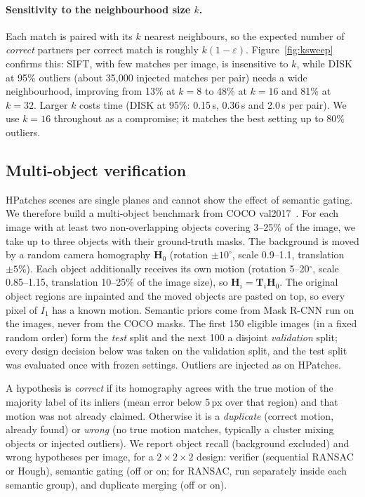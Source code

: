 \documentclass{article}
\begin{document}
\paragraph{Sensitivity to the neighbourhood size $k$.} Each match is paired
with its $k$ nearest neighbours, so the expected number of \emph{correct}
partners per correct match is roughly $k(1-\varepsilon)$. Figure~\ref{fig:ksweep}
confirms this: SIFT, with few matches per image, is insensitive to $k$, while
DISK at 95\% outliers (about 35{,}000 injected matches per pair) needs a wide
neighbourhood, improving from 13\% at $k=8$ to 48\% at $k=16$ and 81\% at
$k=32$. Larger $k$ costs time (DISK at 95\%: 0.15\,s, 0.36\,s and 2.0\,s per
pair). We use $k=16$ throughout as a compromise; it matches the best setting
up to 80\% outliers.

\subsection{Multi-object verification}
\label{sec:multiobj}
HPatches scenes are single planes and cannot show the effect of semantic
gating. We therefore build a multi-object benchmark from COCO
val2017~\cite{lin2014coco}. For each image with at least two non-overlapping
objects covering 3--25\% of the image, we take up to three objects with their
ground-truth masks. The background is moved by a random camera homography
$\mathbf{H}_0$ (rotation $\pm10^\circ$, scale 0.9--1.1, translation $\pm5\%$).
Each object additionally receives its own motion (rotation 5--20$^\circ$,
scale 0.85--1.15, translation 10--25\% of the image size), so
$\mathbf{H}_i = \mathbf{T}_i\mathbf{H}_0$. The original object regions are
inpainted and the moved objects are pasted on top, so every pixel of $I_1$
has a known motion. Semantic priors come from Mask R-CNN run on the images,
never from the COCO masks. The first 150 eligible images (in a fixed random
order) form the \emph{test} split and the next 100 a disjoint
\emph{validation} split; every design decision below was taken on the
validation split, and the test split was evaluated once with frozen settings.
Outliers are injected as on HPatches.

A hypothesis is \emph{correct} if its homography agrees with the true motion
of the majority label of its inliers (mean error below 5\,px over that region)
and that motion was not already claimed. Otherwise it is a \emph{duplicate}
(correct motion, already found) or \emph{wrong} (no true motion matches,
typically a cluster mixing objects or injected outliers). We report object
recall (background excluded) and wrong hypotheses per image, for a
$2\times2\times2$ design: verifier (sequential RANSAC or Hough), semantic
gating (off or on; for RANSAC, run separately inside each semantic group),
and duplicate merging (off or on).
\end{document}
